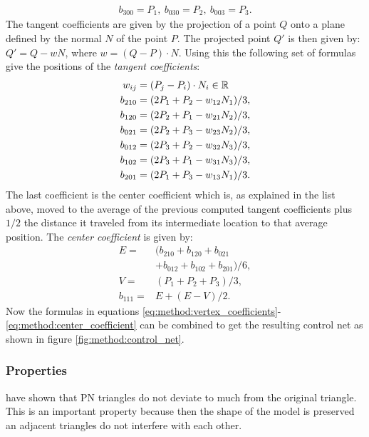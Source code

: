 \begin{align}\label{eq:method:vertex_coefficients}
	b_{300} = P_1,\ b_{030} = P_2,\ b_{003} = P_3.
\end{align}
The tangent coefficients are given by the projection of a point $Q$ onto a plane defined by the normal $N$ of the point $P$. The projected point $Q'$ is then given by: $Q' = Q - wN$, where $w = (Q - P) \cdot N$. Using this the following set of formulas give the positions of the \textit{tangent coefficients}:
\begin{align}\label{eq:method:tangent_coefficients}
	w_{ij} = {}& (P_j - P_i) \cdot N_i \in \mathbb{R} \nonumber\\
	b_{210} = {}& (2 P_1 + P_2 - w_{12}N_1) / 3,\nonumber\\
	b_{120} = {}& (2 P_2 + P_1 - w_{21}N_2) / 3,\nonumber\\
	b_{021} = {}& (2 P_2 + P_3 - w_{23}N_2) / 3, \\
	b_{012} = {}& (2 P_3 + P_2 - w_{32}N_3) / 3,\nonumber\\
	b_{102} = {}& (2 P_3 + P_1 - w_{31}N_3) / 3,\nonumber\\
	b_{201} = {}& (2 P_1 + P_3 - w_{13}N_1) / 3. \nonumber
\end{align}
The last coefficient is the center coefficient which is, as explained in the list above, moved to the average of the previous computed tangent coefficients plus $1/2$ the distance it traveled from its intermediate location to that average position.  The \textit{center coefficient} is given by:
\begin{align}\label{eq:method:center_coefficient}
	E = {}& (b_{210} + b_{120} + b_{021} \nonumber \\
		{}& + b_{012} + b_{102} + b_{201}) / 6, \nonumber\\
	V = {}& (P_1 + P_2 + P_3) / 3, \\
	b_{111} = {}& E + (E - V) / 2. \nonumber
\end{align}
Now the formulas in equations \ref{eq:method:vertex_coefficients}-\ref{eq:method:center_coefficient} can be combined to get the resulting control net as shown in figure \ref{fig:method:control_net}.
\subsubsection{Properties}
\citeauthor{vlachos2001curved} have shown that PN triangles do not deviate to much from the original triangle. This is an important property because then the shape of the model is preserved an adjacent triangles do not interfere with each other. 

